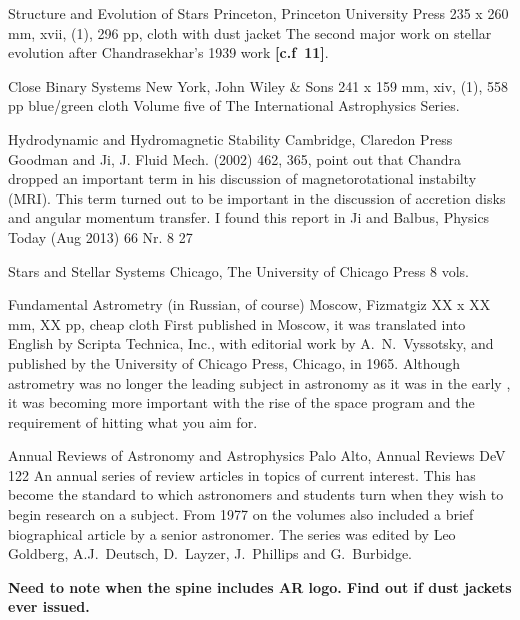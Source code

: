 {Structure and Evolution of Stars}
{Princeton, Princeton University Press}
{235 x 260 mm, xvii, (1), 296 pp, cloth with dust jacket}
{}
The second major work on stellar evolution after Chandrasekhar's 1939 work {\bf [c.f\ 11]}.

{Close Binary Systems}
{New York, John Wiley \& Sons}
{241 x 159 mm, xiv, (1), 558 pp blue/green cloth}
{}
Volume five of The International Astrophysics Series.

{Hydrodynamic and Hydromagnetic Stability}
{Cambridge, Claredon Press}
{}
{}
Goodman and Ji, J. Fluid Mech. (2002) 462, 365, point out that Chandra
dropped an important term in his discussion of magnetorotational
instabilty (MRI). This term turned out to be important in the
discussion of accretion disks and angular momentum transfer.  I found
this report in Ji and Balbus, Physics Today (Aug 2013) 66 Nr. 8 27

{Stars and Stellar Systems}
{Chicago, The University of Chicago Press}
{8 vols.}
{}

{Fundamental Astrometry (in Russian, of course)}
{Moscow, Fizmatgiz}
{XX x XX mm, XX pp, cheap cloth}
{}
First published in Moscow, it was translated into English by Scripta
Technica, Inc., with editorial work by A.\ N.\ Vyssotsky, and published
by the University of Chicago Press, Chicago, in 1965.  Although astrometry
was no longer the leading subject in astronomy as it was in the early ,
it was becoming more important with the rise of the space program and the requirement
of hitting what you aim for.

{Annual Reviews of Astronomy and Astrophysics}
{Palo Alto, Annual Reviews}
{}
{DeV 122}
An annual series of review articles in topics of current interest.  This has become
the standard to which astronomers and students turn when they wish to
begin research on a subject.  From 1977 on the volumes also included a brief biographical
article by a senior astronomer. The series was edited by Leo Goldberg, A.J.\ Deutsch,
D.\ Layzer, J.\ Phillips and G.\ Burbidge.

\textbf{Need to note when the spine includes AR logo. Find out if dust jackets ever issued.}


